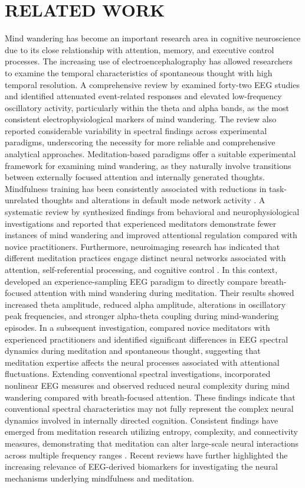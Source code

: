 \documentclass[conference]{IEEEtran}
\begin{document}
\section{RELATED WORK}
Mind wandering has become an important research area in cognitive neuroscience due to its close relationship with attention, memory, and executive control processes. The increasing use of electroencephalography has allowed researchers to examine the temporal characteristics of spontaneous thought with high temporal resolution. A comprehensive review by \cite{KAM2022119372} examined forty-two EEG studies and identified attenuated event-related responses and elevated low-frequency oscillatory activity, particularly within the theta and alpha bands, as the most consistent electrophysiological markers of mind wandering. The review also reported considerable variability in spectral findings across experimental paradigms, underscoring the necessity for more reliable and comprehensive analytical approaches.
Meditation-based paradigms offer a suitable experimental framework for examining mind wandering, as they naturally involve transitions between externally focused attention and internally generated thoughts. Mindfulness training has been consistently associated with reductions in task-unrelated thoughts and alterations in default mode network activity \cite{smallwood2015science}. A systematic review by \cite{feruglio2021impact} synthesized findings from behavioral and neurophysiological investigations and reported that experienced meditators demonstrate fewer instances of mind wandering and improved attentional regulation compared with novice practitioners. Furthermore, neuroimaging research has indicated that different meditation practices engage distinct neural networks associated with attention, self-referential processing, and cognitive control \cite{fox2016functional,lutz2008attention,cahn2013meditation}.
In this context, \cite{rodlarios} developed an experience-sampling EEG paradigm to directly compare breath-focused attention with mind wandering during meditation. Their results showed increased theta amplitude, reduced alpha amplitude, alterations in oscillatory peak frequencies, and stronger alpha-theta coupling during mind-wandering episodes. In a subsequent investigation, \cite{rodriguez2021eeg} compared novice meditators with experienced practitioners and identified significant differences in EEG spectral dynamics during meditation and spontaneous thought, suggesting that meditation expertise affects the neural processes associated with attentional fluctuations.
Extending conventional spectral investigations, \cite{lu2022nonlinear} incorporated nonlinear EEG measures and observed reduced neural complexity during mind wandering compared with breath-focused attention. These findings indicate that conventional spectral characteristics may not fully represent the complex neural dynamics involved in internally directed cognition. Consistent findings have emerged from meditation research utilizing entropy, complexity, and connectivity measures, demonstrating that meditation can alter large-scale neural interactions across multiple frequency ranges \cite{berkovich2012mindfulness}. Recent reviews have further highlighted the increasing relevance of EEG-derived biomarkers for investigating the neural mechanisms underlying mindfulness and meditation.
\end{document}
